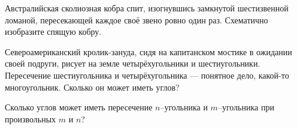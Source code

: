 ﻿

\begin{itemize}
 Австралийская сколиозная кобра спит, изогнувшись замкнутой шестизвенной ломаной, пересекающей каждое своё звено ровно один раз. Схематично изобразите спящую кобру.

\itB Североамериканский кролик-зануда, сидя на капитанском мостике в ожидании своей подруги, рисует на земле четырёхугольники и шестиугольники. Пересечение шестиугольника и четырёхугольника — понятное дело, какой-то многоугольник. Сколько он может иметь углов?

\itC Сколько углов может иметь пересечение $n$--угольника и $m$--угольника при произвольных $m$ и $n$?
\end{itemize}